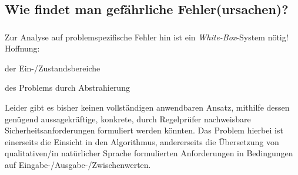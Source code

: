 \subsection{Wie findet man gefährliche Fehler(ursachen)?}
\begin{frame}\frametitle<presentation>{\insertsubsection}
  Zur Analyse auf problemspezifische Fehler hin ist ein
  \emph{White-Box}-System nötig! Hoffnung:
  \begin{description}[<.->]
  \item[Eingrenzung] der Ein-/Zustandsbereiche
  \item[Vereinfachung] des Problems durch Abstrahierung
  \end{description}
\end{frame}
Leider gibt es bisher keinen vollständigen anwendbaren Ansatz,
mithilfe dessen genügend aussagekräftige, konkrete, durch Regelprüfer
nachweisbare Sicherheitsanforderungen formuliert werden könnten.
Das Problem hierbei ist einerseits die Einsicht in den Algorithmus,
andererseits die Übersetzung von qualitativen/in natürlicher Sprache
formulierten Anforderungen in Bedingungen auf
Eingabe-/Ausgabe-/Zwischenwerten.

